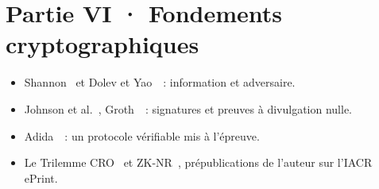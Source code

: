 \section*{Partie VI · Fondements cryptographiques}
\begin{itemize}
    \item Shannon~\cite{shannon1948} et Dolev et Yao~\cite{dolevyao1983}~: information et adversaire.
    \item Johnson et al.~\cite{johnson2001ecdsa}, Groth~\cite{groth2016zksnark}~: signatures et preuves à divulgation nulle.
    \item Adida~\cite{adida2009helios,adida2009university}~: un protocole vérifiable mis à l'épreuve.
    \item Le Trilemme CRO~\cite{minka2025cro} et ZK-NR~\cite{minka2025zknr}, prépublications de l'auteur sur l'IACR ePrint.
\end{itemize}
